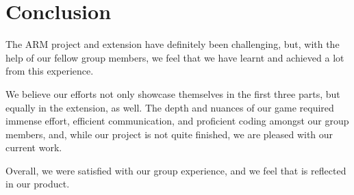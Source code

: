\documentclass[11pt]{article}
\begin{document}
\section{Conclusion}

The ARM project and extension have definitely been challenging, but, with the help of our fellow group members, we feel that we have learnt and achieved a lot from this experience.

\vspace{0.2in}

We believe our efforts not only showcase themselves in the first three parts, but equally in the extension, as well. The depth and nuances of our game required immense effort, efficient communication, and proficient coding amongst our group members, and, while our project is not quite finished, we are pleased with our current work.

\vspace{0.2in}

Overall, we were satisfied with our group experience, and we feel that is reflected in our product.
\end{document}
